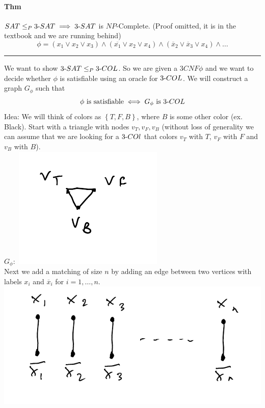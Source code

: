 \documentclass[12 pt]{article}
\begin{document}
          \paragraph{Thm} $SAT \leq_P 3\hbox{-}SAT \implies
          3\hbox{-}SAT$ is $NP$-Complete. (Proof omitted, it is in the
          textbook and we are running behind)
          $$\phi = (x_1 \lor x_2 \lor x_3) \land (\overline{x_1} \lor
          x_2 \lor x_4) \land (\overline{x}_2 \lor \overline{x}_3 \lor
          x_4) \land \ldots$$
          \noindent \rule{\textwidth}{0.5pt}
          We want to show $3\hbox{-}SAT \leq_P 3\hbox{-}COL$. So we
          are given a $3CNF \phi$ and we want to decide whether $\phi$
          is satisfiable using an oracle for $3\hbox{-}COL$. We will
          construct a graph $G_\phi$ such that $$\phi \text{ is satisfiable}
          \iff G_\phi \text{ is }3\hbox{-}COL$$
          Idea: We will think of colors as $\left\{T,F,B\right\}$,
          where $B$ is some other color (ex. Black). Start with a
          triangle with nodes $v_T, v_F, v_B$ (without loss of
          generality we can assume that we are looking for a
          $3\hbox{-}COl$ that colors $v_T$ with $T$, $v_F$ with $F$
          and $v_B$ with $B$).
          \\ $G_\phi:$ \includegraphics[width=.4\textwidth]{i134.pdf}
          \\ Next we add a matching of size $n$ by adding an edge
          between two vertices with labels $x_i$ and $\overline{x}_i$
          for $i=1,\ldots,n$.
          \\ \includegraphics[width=.9\textwidth]{i126.pdf}
\end{document}
